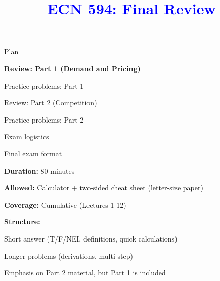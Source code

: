 \documentclass[notes,11pt, aspectratio=169]{beamer}
\title[]{\textcolor{blue}{ECN 594: Final Review}}
\author[PGP]{}
\institute[FRBNY]{\small{\begin{tabular}{c c c}
Nicholas Vreugdenhil \\
\end{tabular}}}
\date{}
\newenvironment{wideitemize}{\itemize\addtolength{\itemsep}{10pt}}{\enditemize}
\newenvironment{wideenumerate}{\enumerate\addtolength{\itemsep}{10pt}}{\endenumerate}
\begin{document}
\begin{frame}
\maketitle
  \centering
\end{frame}

\begin{frame}{Plan}
  \begin{wideenumerate}
    \item \textbf{Review: Part 1 (Demand and Pricing)}
    \item Practice problems: Part 1
    \item Review: Part 2 (Competition)
    \item Practice problems: Part 2
    \item Exam logistics
  \end{wideenumerate}
\end{frame}

\begin{frame}{Final exam format}
	\begin{wideitemize}
		\item \textbf{Duration:} 80 minutes
		\item \textbf{Allowed:} Calculator + two-sided cheat sheet (letter-size paper)
		\item \textbf{Coverage:} Cumulative (Lectures 1-12)
		\item \textbf{Structure:}
		\begin{wideitemize}
			\vspace{5pt}
			\item Short answer (T/F/NEI, definitions, quick calculations)
			\item Longer problems (derivations, multi-step)
		\end{wideitemize}
		\item Emphasis on Part 2 material, but Part 1 is included
	\end{wideitemize}
\end{frame}

\end{document}
